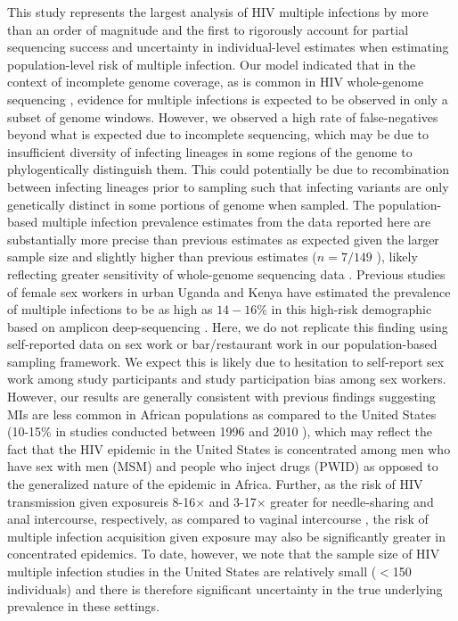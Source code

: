 \documentclass[10pt,letterpaper]{article}
\begin{document}
This study represents the largest analysis of HIV multiple infections by more than an order of magnitude \cite{yuan2024} and the first to rigorously account for partial sequencing success and uncertainty in individual-level estimates when estimating population-level risk of multiple infection. Our model indicated that in the context of incomplete genome coverage, as is common in HIV whole-genome sequencing \cite{bonsall2020}, evidence for multiple infections is expected to be observed in only a subset of genome windows. However, we observed a high rate of false-negatives beyond what is expected due to incomplete sequencing, which may be due to insufficient diversity of infecting lineages in some regions of the genome \cite{patino2017} to phylogentically distinguish them. This could potentially be due to recombination between infecting lineages prior to sampling \cite{shriner2004, song2018} such that infecting variants are only genetically distinct in some portions of genome when sampled. The population-based multiple infection prevalence estimates from the data reported here are substantially more precise than previous estimates as expected given the larger sample size and slightly higher than previous estimates ($n=7/149$ \cite{redd2012}), likely reflecting greater sensitivity of whole-genome sequencing data . Previous studies of female sex workers in urban Uganda and Kenya have estimated the prevalence of multiple infections to be as high as $14-16\%$ in this high-risk demographic based on amplicon deep-sequencing \cite{ronen2013,redd2014}. Here, we do not replicate this finding using self-reported data on sex work or bar/restaurant work in our population-based sampling framework. We expect this is likely due to hesitation to self-report sex work among study participants and study participation bias among sex workers. However, our results are generally consistent with previous findings suggesting MIs are less common in African populations as compared to the United States (10-15\% in studies conducted between 1996 and 2010 \cite{pacold2012,wagner2013,wagner2014,wagner2016,vesa2017}), which may reflect the fact that the HIV epidemic in the United States is concentrated among men who have sex with men (MSM) and people who inject drugs (PWID) as opposed to the generalized nature of the epidemic in Africa. Further, as the risk of HIV transmission given exposureis 8-16$\times$ and 3-17$\times$ greater for needle-sharing and anal intercourse, respectively, as compared to vaginal intercourse \cite{patel2014}, the risk of multiple infection acquisition given exposure may also be significantly greater in concentrated epidemics. To date, however, we note that the sample size of HIV multiple infection studies in the United States are relatively small ($<$150 individuals) and there is therefore significant uncertainty in the true underlying prevalence in these settings. \par
\end{document}
